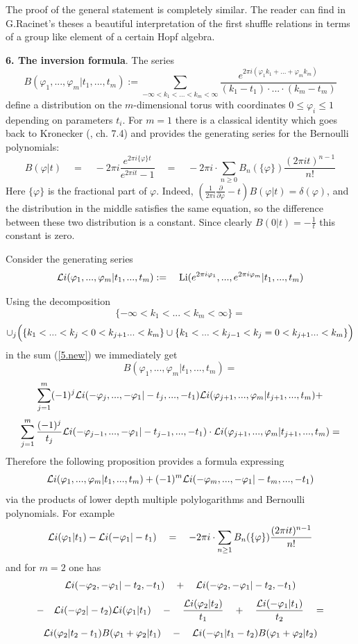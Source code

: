 \documentclass[10pt]{article}
\begin{document}
The proof of the general statement is completely similar.
The reader can find in 
G.Racinet's theses \cite{R} a beautiful interpretation of the 
first shuffle relations in terms of a 
group like element of a certain Hopf algebra. 

{\bf 6. The inversion formula}. 
The series
$$
B(\varphi_1, ..., \varphi_m | t_1, ..., t_m):= \sum_{-\infty <k_1< ...< k_m < \infty}
\frac{e^{2\pi i (\varphi_1 k_1 + ... + \varphi_m k_m)}}{(k_1-t_1) \cdot ... \cdot (k_m-t_m)}
$$
define a distribution on the $m$-dimensional torus with coordinates 
$0 \leq \varphi_i \leq 1$  depending on parameters $t_i$. For $m=1$ there is 
 a classical identity which goes back to Kronecker (\cite{We}, ch. 7.4) 
and provides the generating series for the Bernoulli polynomials:
$$
B(\varphi| t) \quad = \quad  -2\pi i
\frac{e^{2\pi i \{\varphi\}t}}{e^{2\pi i t}-1}\quad = \quad -2\pi i \cdot \sum_{n \geq 0} B_n(\{\varphi\}) 
\frac{(2 \pi i t)^{n-1}}{n!}
$$
Here $\{\varphi\}$ is the fractional part of $\varphi $. Indeed, 
$(\frac{1}{2\pi i} \frac{\partial}{\partial \varphi} - t)B(\varphi|t) = \delta(\varphi)$, 
and the distribution in the middle satisfies the same equation, 
so the difference between these two 
distribution  is a constant. Since clearly $B(0|t) = -\frac{1}{t}$ this constant is zero. 

Consider  the generating series 
$$
{\cal L}i(\varphi_{1}, ..., \varphi_m| t_{1}, ..., t_{m}):= \quad 
{\rm Li}(e^{2\pi i \varphi_{1}}, ..., e^{2\pi i \varphi_{m}}| t_{1}, ..., t_{m})
$$

Using the decomposition 
$$
\{-\infty <k_1< ...< k_m < \infty\} = 
$$
$$
\cup_{j}\Bigl(  \{k_1< ...< k_j < 0 < k_{j+1}... < k_m\} 
\cup  \{k_1< ...< k_{j-1} < k_j = 0 < k_{j+1}... < k_m\}\Bigr) 
$$ in the sum  (\ref{5.new}) we immediately get
\begin{equation} \label{12.2.00.4}
B(\varphi_1, ... ,\varphi_m | t_1, ..., t_m) = 
\end{equation}
$$
\sum_{j=1}^m (-1)^j {\cal L}i(-\varphi_j, ..., -\varphi_1 | -t_j, ..., -t_1) 
{\cal L}i(\varphi_{j+1}, ..., \varphi_m | t_{j+1}, ..., t_m) + 
$$
$$
\sum_{j=1}^m \frac{(-1)^{j}}{t_j}
{\cal L}i(-\varphi_{j-1}, ..., -\varphi_1| -t_{j-1}, ...,
- t_{1}) \cdot 
{\cal L}i(\varphi_{j+1}, ..., \varphi_m | t_{j+1}, ..., t_m) =
$$
Therefore the following proposition provides a formula expressing 
$$
{\cal L}i(\varphi_{1}, ..., \varphi_m| t_{1}, ..., t_{m}) + (-1)^m 
{\cal L}i(-\varphi_{m}, ..., -\varphi_1| -t_{m}, ..., -t_{1})
$$
via the products of lower depth multiple polylogarithms and Bernoulli polynomials. 
For example
$$
{\cal L}i(\varphi_{1}| t_{1}) -
{\cal L}i(-\varphi_1| - t_{1})  \quad = \quad -2\pi i 
\cdot \sum_{n \geq 1} B_n(\{\varphi\})\frac{(2 \pi i t)^{n-1}}{n!}
$$
and for $m=2$ one has 
$$
{\cal L}i(-\varphi_{2}, -\varphi_{1}| -t_{2}, -t_{1}) \quad  + \quad {\cal L}i(-\varphi_{2}, -\varphi_{1}| -t_{2}, -t_{1})  
$$
$$- \quad 
{\cal L}i(-\varphi_{2}| -t_{2}){\cal L}i(\varphi_{1}| t_{1}) \quad - \quad \frac{{\cal L}i(\varphi_{2}| t_{2})}{t_{1}} \quad + \quad 
\frac{{\cal L}i(-\varphi_{1}| t_{1})}{t_{2}} \quad =
$$
$$
{\cal L}i(\varphi_{2}| t_{2}-t_{1}) B(\varphi_{1}+ \varphi_{2}|t_1 )\quad  - \quad 
{\cal L}i(-\varphi_{1}| t_{1}-t_{2}) B(\varphi_{1}+ \varphi_{2}|t_2)
$$
\end{document}
